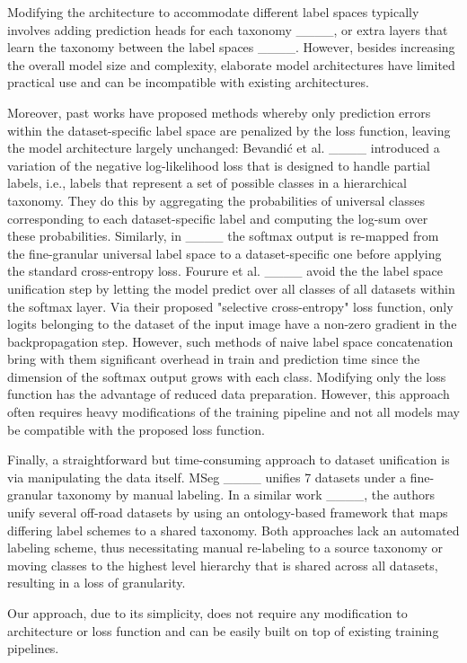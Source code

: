 Modifying the architecture to accommodate different label spaces typically involves adding prediction heads for each taxonomy ____, or extra layers that learn the taxonomy between the label spaces ____.
However, besides increasing the overall model size and complexity, elaborate model architectures have limited practical use and can be incompatible with existing architectures.

Moreover, past works have proposed methods whereby only prediction errors within the dataset-specific label space are penalized by the loss function, leaving the model architecture largely unchanged:
Bevandi\'{c} et al. ____ introduced a variation of the negative log-likelihood loss that is designed to handle partial labels, i.e., labels that represent a set of possible classes in a hierarchical taxonomy.
They do this by aggregating the probabilities of universal classes corresponding to each dataset-specific label and computing the log-sum over these probabilities.
Similarly, in ____ the softmax output is re-mapped from the fine-granular universal label space to a dataset-specific one before applying the standard cross-entropy loss.
Fourure et al. ____ avoid the the label space unification step by letting the model predict over all classes of all datasets within the softmax layer.
Via their proposed "selective cross-entropy" loss function, only logits belonging to the dataset of the input image have a non-zero gradient in the backpropagation step.
However, such methods of naive label space concatenation bring with them significant overhead in train and prediction time since the dimension of the softmax output grows with each class.
Modifying only the loss function has the advantage of reduced data preparation.
However, this approach often requires heavy modifications of the training pipeline and not all models may be compatible with the proposed loss function.

Finally, a straightforward but time-consuming approach to dataset unification is via manipulating the data itself.
MSeg ____ unifies 7 datasets under a fine-granular taxonomy by manual labeling.
In a similar work ____, the authors unify several off-road datasets by using an ontology-based framework that maps differing label schemes to a shared taxonomy. 
Both approaches lack an automated labeling scheme, thus necessitating manual re-labeling to a source taxonomy or moving classes to the highest level hierarchy that is shared across all datasets, resulting in a loss of granularity.

Our approach, due to its simplicity, does not require any modification to architecture or loss function and can be easily built on top of existing training pipelines.